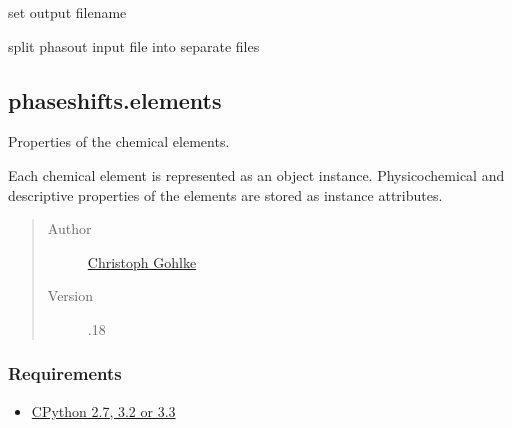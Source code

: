 \documentclass[letterpaper,10pt,english]{sphinxmanual}
\begin{document}
\begin{fulllineitems}
\begin{fulllineitems}
\label{modules:phaseshifts.conphas.Conphas.set_output_file}
set output filename

\end{fulllineitems}


\begin{fulllineitems}
\label{modules:phaseshifts.conphas.Conphas.split_phasout}
split phasout input file into separate files

\end{fulllineitems}


\end{fulllineitems}



\subsection{phaseshifts.elements}
\label{modules:phaseshifts-elements}\label{modules:module-phaseshifts.elements}
Properties of the chemical elements.

Each chemical element is represented as an object instance. Physicochemical
and descriptive properties of the elements are stored as instance attributes.
\begin{quote}\begin{description}
\item[{Author}] \leavevmode
\href{http://www.lfd.uci.edu/~gohlke/}{Christoph Gohlke}

\item[{Version}] .18

\end{description}\end{quote}


\subsubsection{Requirements}
\label{modules:requirements}\begin{itemize}
\item {} 
\href{http://www.python.org}{CPython 2.7, 3.2 or 3.3}

\end{itemize}
\end{document}
